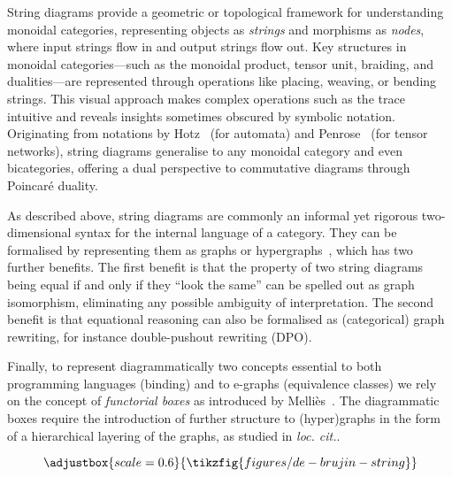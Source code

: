 \documentclass[]{IEEEtran}
\begin{document}
String diagrams provide a geometric or topological framework for understanding monoidal categories, representing objects as \emph{strings} and morphisms as \emph{nodes}, where input strings flow in and output strings flow out. 
Key structures in monoidal categories---such as the monoidal product, tensor unit, braiding, and dualities---are represented through operations like placing, weaving, or bending strings. 
This visual approach makes complex operations such as the trace intuitive and reveals insights sometimes obscured by symbolic notation. 
Originating from notations by Hotz~\cite{hotzsd} (for automata) and Penrose~\cite{penrose1984spinors} (for tensor networks), string diagrams generalise to any monoidal category and even bicategories, offering a dual perspective to commutative diagrams through Poincaré duality. 

As described above, string diagrams are commonly an informal yet rigorous two-dimensional syntax for the internal language of a category. 
They can be formalised by representing them as graphs or hypergraphs~\cite{1011453502719}, which has two further benefits. 
The first benefit is that the property of two string diagrams being equal if and only if they ``look the same'' can be spelled out as graph isomorphism, eliminating any possible ambiguity of interpretation. 
The second benefit is that equational reasoning can also be formalised as (categorical) graph rewriting, for instance double-pushout rewriting (DPO). 

Finally, to represent diagrammatically two concepts essential to both programming languages (binding) and to e-graphs (equivalence classes) we rely on the concept of \emph{functorial boxes} as introduced by Melli\`es~\cite{10.1007/11874683_1}. 
The diagrammatic boxes require the introduction of further structure to (hyper)graphs in the form of a hierarchical layering of the graphs, as studied in \emph{loc. cit.}.

\begin{wrapfigure}{L}{0.2\textwidth}
\[
\adjustbox{scale=0.6}{
    \tikzfig{figures/de-brujin-string}
}
\]
\end{wrapfigure}
\end{document}

